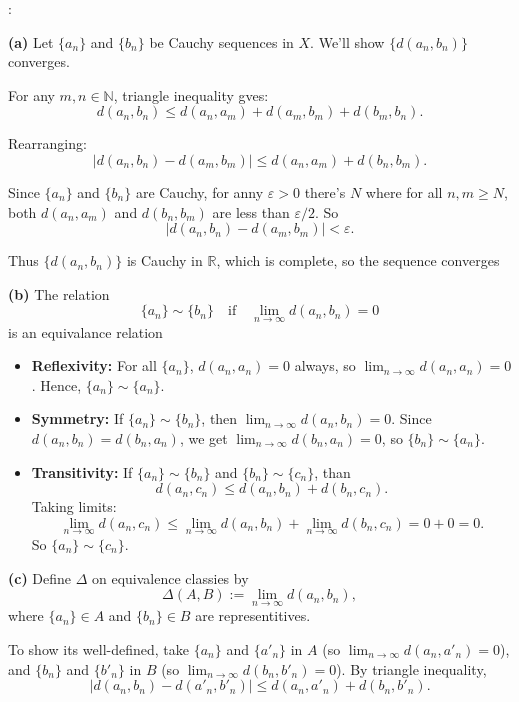 \documentclass[12pt,oneside]{article}
\theoremstyle{definition}
\begin{document}
\begin{solution}
:

\textbf{(a)} Let \(\{a_n\}\) and \(\{b_n\}\) be Cauchy sequences in \(X\). We'll show \(\{d(a_n,b_n)\}\) converges. 

For any \(m,n\in \mathbb{N}\), triangle inequality gves:
\[
d(a_n, b_n) \le d(a_n, a_m) + d(a_m, b_m) + d(b_m, b_n).
\]

Rearranging:
\[
\big|d(a_n, b_n) - d(a_m, b_m)\big| \le d(a_n,a_m) + d(b_n,b_m).
\]

Since \(\{a_n\}\) and \(\{b_n\}\) are Cauchy, for anny \(\varepsilon>0\) there's \(N\) where for all \(n,m\ge N\), both \(d(a_n,a_m)\) and \(d(b_n,b_m)\) are less than \(\varepsilon/2\). So
\[
\big|d(a_n, b_n) - d(a_m, b_m)\big| < \varepsilon.
\]

Thus \(\{d(a_n,b_n)\}\) is Cauchy in \(\mathbb{R}\), which is complete, so the sequence converges

\textbf{(b)} The relation 
\[
\{a_n\} \sim \{b_n\} \quad\text{if}\quad \lim_{n\to\infty}d(a_n,b_n)=0
\]
is an equivalance relation
\begin{itemize}
    \item \textbf{Reflexivity:} For all \(\{a_n\}\), \(d(a_n,a_n)=0\) always, so \(\lim_{n\to\infty} d(a_n,a_n)=0\). Hence, \(\{a_n\}\sim \{a_n\}\).
    \item \textbf{Symmetry:} If \(\{a_n\}\sim \{b_n\}\), then \(\lim_{n\to\infty}d(a_n,b_n)=0\). Since \(d(a_n,b_n)=d(b_n,a_n)\), we get \(\lim_{n\to\infty} d(b_n,a_n)=0\), so \(\{b_n\}\sim \{a_n\}\).
    \item \textbf{Transitivity:} If \(\{a_n\}\sim \{b_n\}\) and \(\{b_n\}\sim \{c_n\}\), than
    \[
    d(a_n,c_n) \le d(a_n,b_n) + d(b_n,c_n).
    \]
    Taking limits:
    \[
    \lim_{n\to\infty}d(a_n,c_n) \le \lim_{n\to\infty}d(a_n,b_n) + \lim_{n\to\infty}d(b_n,c_n)= 0 + 0 = 0.
    \]
    So \(\{a_n\}\sim \{c_n\}\).
\end{itemize}

\textbf{(c)} Define \(\Delta\) on equivalence classies by
\[
\Delta(A,B) := \lim_{n\to\infty}d(a_n,b_n),
\]
where \(\{a_n\}\in A\) and \(\{b_n\}\in B\) are representitives. 

To show its well-defined, take \(\{a_n\}\) and \(\{a'_n\}\) in \(A\) (so \(\lim_{n\to\infty}d(a_n,a'_n)=0\)), and \(\{b_n\}\) and \(\{b'_n\}\) in \(B\) (so \(\lim_{n\to\infty}d(b_n,b'_n)=0\)). By triangle inequality,
\[
\big|d(a_n,b_n)-d(a'_n,b'_n)\big|\le d(a_n,a'_n)+d(b_n,b'_n).
\]


\end{solution}
\end{document}
